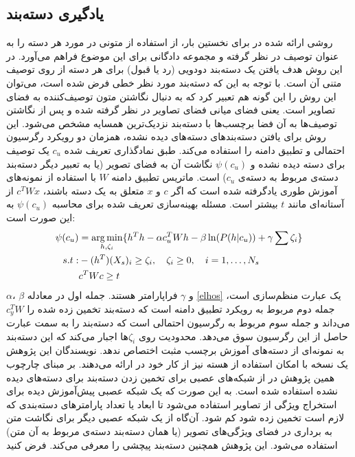 \subsection{یادگیری دسته‌بند}\label{learnclassifer}
روشی ارائه شده در \cite{ mohamed13} برای نخستین بار، از استفاده از متونی در مورد هر دسته را به عنوان توصیف در نظر گرفته و مجموعه دادگانی برای این موضوع فراهم می‌آورد. در این روش هدف یافتن یک دسته‌بند دودویی (رد یا قبول) برای هر دسته از روی توصیف متنی آن است. با توجه به این که دسته‌بند مورد نظر خطی فرض شده است، می‌توان این روش را این گونه هم تعبیر کرد که به دنبال نگاشتن متون توصیف‌کننده به فضای تصاویر است. یعنی فضای میانی فضای تصاویر در نظر گرفته شده و پس از نگاشتن توصیف‌ها به آن فضا برچسب‌ها با دسته‌بند نزدیک‌ترین همسایه مشخص می‌شود. این روش برای یافتن دسته‌بندهای دسته‌های دیده نشده، همزمان دو رویکرد رگرسیون احتمالی
 و تطبیق دامنه را استفاده می‌کند. طبق نمادگذاری تعریف شده  $c_u$ یک توصیف برای دسته دیده نشده  و $\psi(c_u)$ نگاشت آن به فضای تصویر (یا به تعبیر دیگر دسته‌بند دسته‌ی مربوط به دسته‌ی $c_u$) است. ماتریس تطبیق دامنه $W$ با استفاده از نمونه‌های آموزش طوری یادگرفته شده است که اگر $c$ و $x$ متعلق به یک دسته باشند، $c^TWx$ از آستانه‌ای مانند $t$ بیشتر است. مسئله بهینه‌سازی تعریف شده برای محاسبه  $\psi(c_u)$ به این صورت است:
\begin{align}\label{elhos}
\psi(c_u) &= \operatorname*{arg\,min}_{h, \zeta_i} \{ h^Th  - \alpha c_u^TWh - \beta \ln(P(h|c_u)) + \gamma \sum \zeta_i \} \\
s.t: & -(h^T)(X_s)_i \geq \zeta_i, \quad \zeta_i \geq 0, \quad i=1,\ldots, N_s  \nonumber \\
& c^TWc \geq t \nonumber
\end{align}
$\alpha$، $\beta$ 
و $\gamma$ فراپارامتر هستند. جمله اول در معادله \eqref{elhos} یک عبارت منظم‌سازی است، جمله دوم مربوط به رویکرد تطبیق دامنه است که دسته‌بند تخمین زده شده را $c_y^TW$ می‌داند و جمله سوم مربوط به رگرسیون احتمالی است که دسته‌بند را به سمت عبارت حاصل از این رگرسیون سوق می‌دهد. محدودیت روی $\zeta_i$ها اجبار می‌کند که این دسته‌بند به نمونه‌ای از دسته‌های آموزش برچسب مثبت اختصاص ندهد. نویسندگان این پژوهش یک نسخه با امکان استفاده از هسته نیز از کار خود در 
\cite{elhoseiny2015} 
ارائه می‌دهند. بر مبنای چارچوب همین پژوهش در  \cite{ba2015} از شبکه‌های عصبی برای تخمین زدن دسته‌بند برای دسته‌های دیده نشده استفاده شده است. به این صورت که یک شبکه عصبی پیش‌آموزش دیده برای استخراج ویژگی از تصاویر استفاده می‌شود تا ابعاد یا تعداد پارامترهای دسته‌بندی که لازم است تخمین زده شود کم شود. آن‌گاه از یک شبکه عصبی دیگر برای نگاشت متن به برداری در فضای ویژگی‌های تصویر (یا همان دسته‌بند دسته‌ی مربوط به آن متن) استفاده می‌شود. این پژوهش همچنین دسته‌بند پیچشی  را معرفی می‌کند. فرض کنید 
